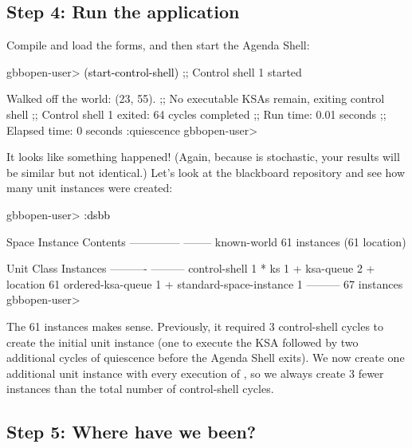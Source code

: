 \documentclass[10pt,twoside,english,pdftex]{article}
\begin{document}
\subsection*{Step 4:  Run the application}

%
%
Compile and load the  forms, and then start the Agenda
Shell:
%
\W\supp
\begin{example}
\textcolor{darkergray}{%
  gbbopen-user> \textcolor{black}{(start-control-shell)}
  ;; Control shell 1 started

  Walked off the world: (23, 55).
  ;; No executable KSAs remain, exiting control shell
  ;; Control shell 1 exited: 64 cycles completed
  ;; Run time: 0.01 seconds
  ;; Elapsed time: 0 seconds
  :quiescence
  gbbopen-user>}
\end{example}

%
It looks like something happened! (Again, because 
is stochastic, your results will be similar but not identical.)  Let's look at
the blackboard repository and see how many  unit instances were
created:
%
\W\supp
\begin{example}
\textcolor{darkergray}{%
  gbbopen-user> \textcolor{black}{:dsbb}

  Space Instance                Contents
  --------------                --------
  known-world                   61 instances (61 location)

  Unit Class                    Instances
  ----------                    ---------
  control-shell                         1 *
  ks                                    1 +
  ksa-queue                             2 +
  location                             61
  ordered-ksa-queue                     1 +
  standard-space-instance               1
                                ---------
                                       67 instances
  gbbopen-user>}
\end{example}

The 61  instances makes sense.  Previously, it required 3
control-shell cycles to create the initial  unit instance (one
to execute the  KSA followed by two additional cycles of
quiescence before the Agenda Shell exits).  We now create one additional
 unit instance with every execution of ,
so we always create 3 fewer  instances than the total
number of control-shell cycles.

\subsection*{Step 5:  Where have we been?}
\end{document}

